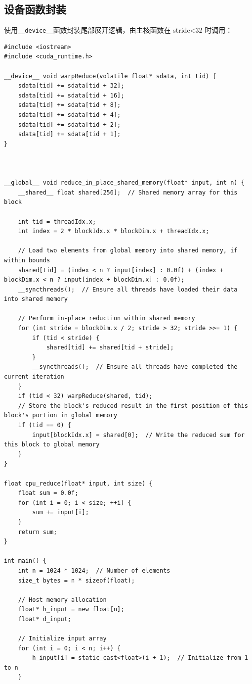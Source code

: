 \subsection{设备函数封装}
使用\verb|__device__|函数封装尾部展开逻辑，由主核函数在 stride<32 时调用：
\begin{lstlisting}[caption={Warp级循环展开设备函数}]
#include <iostream>
#include <cuda_runtime.h>

__device__ void warpReduce(volatile float* sdata, int tid) {
    sdata[tid] += sdata[tid + 32];
    sdata[tid] += sdata[tid + 16];
    sdata[tid] += sdata[tid + 8];
    sdata[tid] += sdata[tid + 4];
    sdata[tid] += sdata[tid + 2];
    sdata[tid] += sdata[tid + 1];
}



__global__ void reduce_in_place_shared_memory(float* input, int n) {
    __shared__ float shared[256];  // Shared memory array for this block

    int tid = threadIdx.x;
    int index = 2 * blockIdx.x * blockDim.x + threadIdx.x;

    // Load two elements from global memory into shared memory, if within bounds
    shared[tid] = (index < n ? input[index] : 0.0f) + (index + blockDim.x < n ? input[index + blockDim.x] : 0.0f);
    __syncthreads();  // Ensure all threads have loaded their data into shared memory

    // Perform in-place reduction within shared memory
    for (int stride = blockDim.x / 2; stride > 32; stride >>= 1) {
        if (tid < stride) {
            shared[tid] += shared[tid + stride];
        }
        __syncthreads();  // Ensure all threads have completed the current iteration
    }
    if (tid < 32) warpReduce(shared, tid);
    // Store the block's reduced result in the first position of this block's portion in global memory
    if (tid == 0) {
        input[blockIdx.x] = shared[0];  // Write the reduced sum for this block to global memory
    }
}

float cpu_reduce(float* input, int size) {
    float sum = 0.0f;
    for (int i = 0; i < size; ++i) {
        sum += input[i];
    }
    return sum;
}

int main() {
    int n = 1024 * 1024;  // Number of elements
    size_t bytes = n * sizeof(float);

    // Host memory allocation
    float* h_input = new float[n];
    float* d_input;

    // Initialize input array
    for (int i = 0; i < n; i++) {
        h_input[i] = static_cast<float>(i + 1);  // Initialize from 1 to n
    }


\end{lstlisting}
